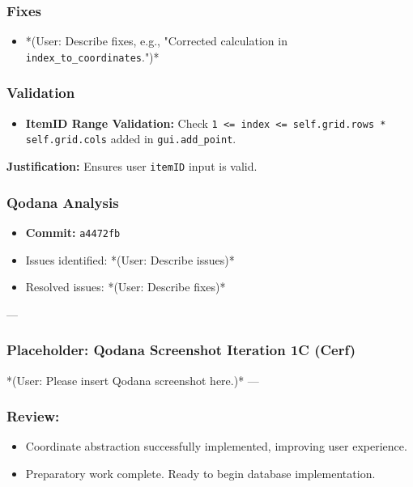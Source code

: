 \subsubsection{Fixes}
\begin{itemize}
	\item *(User: Describe fixes, e.g., "Corrected calculation in \verb|index_to_coordinates|.")*
\end{itemize}

\subsubsection{Validation}
\begin{itemize}
	\item \textbf{ItemID Range Validation:} Check \verb|1 <= index <= self.grid.rows * self.grid.cols| added in \verb|gui.add_point|.
\end{itemize}
\textbf{Justification:} Ensures user \verb|itemID| input is valid.

\subsubsection{Qodana Analysis}
\begin{itemize}
	\item \textbf{Commit:} \verb|a4472fb|
	\item Issues identified: *(User: Describe issues)*
	\item Resolved issues: *(User: Describe fixes)*
\end{itemize}

--- %
\subsubsection*{Placeholder: Qodana Screenshot Iteration 1C (Cerf)}
*(User: Please insert Qodana screenshot here.)*
---

\subsubsection{Review:}
\begin{itemize}
	\item Coordinate abstraction successfully implemented, improving user experience.
	\item Preparatory work complete. Ready to begin database implementation.
\end{itemize}

\newpage

